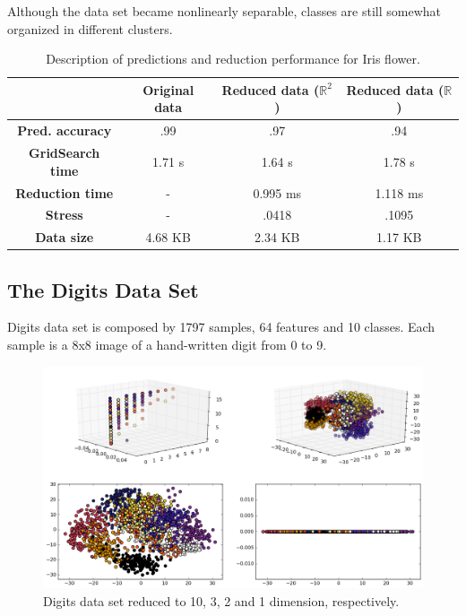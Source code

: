 \documentclass[12pt]{report}
\begin{document}
Although the data set became nonlinearly separable, classes are still somewhat organized in different clusters.

\begin{table}[H]
	\centering

	\begin{tabular}{|c|c|c|c|}
		\hline
		& \textbf{Original data} & \textbf{Reduced data ($\mathbb{R}^2$)} & \textbf{Reduced data ($\mathbb{R}$)} \\\hline
		\textbf{Pred. accuracy} & .99 & .97 & .94 \\\hline
		\textbf{GridSearch time} & 1.71 s & 1.64 s & 1.78 s \\\hline
		\textbf{Reduction time} & - & 0.995 ms & 1.118 ms \\\hline
		\textbf{Stress} & - & .0418 & .1095 \\\hline
		\textbf{Data size} & 4.68 KB & 2.34 KB & 1.17 KB \\\hline
	\end{tabular}

	\caption{Description of predictions and reduction performance for Iris flower.}
\end{table}

\subsection{The Digits Data Set}

Digits data set is composed by 1797 samples, 64 features and 10 classes. Each sample is a 8x8 image of a hand-written digit from 0 to 9.

\begin{figure}[H]
	\centering
	\captionsetup{justification=centering}
	\includegraphics[width=\linewidth]{experiments/pca_digits}
	\caption{Digits data set reduced to 10, 3, 2 and 1 dimension, respectively.}
	\label{fig:dsdigitspca}
\end{figure}
\end{document}

